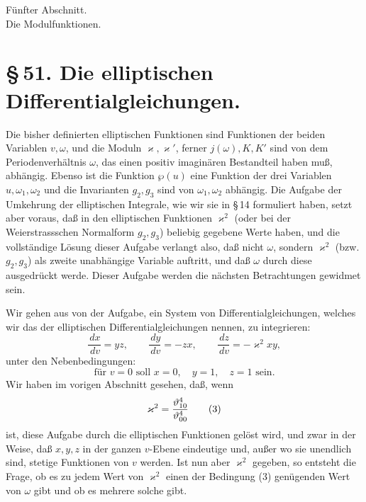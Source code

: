 \documentclass[11pt]{article}
\providecommand{\dd}{\,d}
\providecommand{\tht}{\vartheta}
\begin{document}
\begin{center}
{\large Fünfter Abschnitt.}\\[0.7em]
{\Large Die Modulfunktionen.}
\end{center}

\section*{\S\,51. Die elliptischen Differentialgleichungen.}

Die bisher definierten elliptischen Funktionen sind Funktionen der beiden Variablen $v,\omega$, und die Moduln $\varkappa,\varkappa'$, ferner $j(\omega),K,K'$ sind von dem Periodenverhältnis $\omega$, das einen positiv imaginären Bestandteil haben muß, abhängig. Ebenso ist die Funktion $\wp(u)$ eine Funktion der drei Variablen $u,\omega_1,\omega_2$ und die Invarianten $g_2,g_3$ sind von $\omega_1,\omega_2$ abhängig. Die Aufgabe der Umkehrung der elliptischen Integrale, wie wir sie in \S\,14 formuliert haben, setzt aber voraus, daß in den elliptischen Funktionen $\varkappa^2$ (oder bei der Weierstrassschen Normalform $g_2,g_3$) beliebig gegebene Werte haben, und die vollständige Lösung dieser Aufgabe verlangt also, daß nicht $\omega$, sondern $\varkappa^2$ (bzw. $g_2,g_3$) als zweite unabhängige Variable auftritt, und daß $\omega$ durch diese ausgedrückt werde. Dieser Aufgabe werden die nächsten Betrachtungen gewidmet sein.

Wir gehen aus von der Aufgabe, ein System von Differentialgleichungen, welches wir das der elliptischen Differentialgleichungen nennen, zu integrieren:
\begin{equation}
\frac{\dd x}{\dd v}=yz,\qquad
\frac{\dd y}{\dd v}=-zx,\qquad
\frac{\dd z}{\dd v}=-\varkappa^2xy,
\tag{1}
\end{equation}
unter den Nebenbedingungen:
\begin{equation}
\text{für }v=0\text{ soll }x=0,
\quad y=1,
\quad z=1\text{ sein.}
\tag{2}
\end{equation}
Wir haben im vorigen Abschnitt gesehen, daß, wenn
\begin{equation}
\varkappa^2={\tht_{10}^4\over\tht_{00}^4}
\tag{3}
\end{equation}
ist, diese Aufgabe durch die elliptischen Funktionen gelöst wird, und zwar in der Weise, daß $x,y,z$ in der ganzen $v$-Ebene eindeutige und, außer wo sie unendlich sind, stetige Funktionen von $v$ werden. Ist nun aber $\varkappa^2$ gegeben, so entsteht die Frage, ob es zu jedem Wert von $\varkappa^2$ einen der Bedingung (3) genügenden Wert von $\omega$ gibt und ob es mehrere solche gibt.
\end{document}
